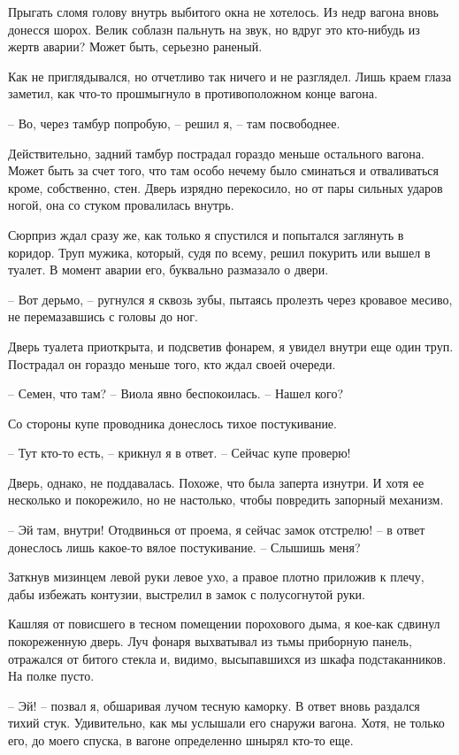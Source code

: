 \documentclass[a4paper]{book}
\begin{document}
Прыгать сломя голову внутрь выбитого окна не хотелось. Из недр вагона вновь донесся шорох. Велик соблазн пальнуть на звук, но вдруг это кто-нибудь из жертв аварии? Может быть, серьезно раненый.

Как не приглядывался, но отчетливо так ничего и не разглядел. Лишь краем глаза заметил, как что-то прошмыгнуло в противоположном конце вагона.

-- Во, через тамбур попробую, -- решил я, -- там посвободнее. 

Действительно, задний тамбур пострадал гораздо меньше остального вагона. Может быть за счет того, что там особо нечему было сминаться и отваливаться кроме, собственно, стен. Дверь изрядно перекосило, но от пары сильных ударов ногой, она со стуком провалилась внутрь.

Сюрприз ждал сразу же, как только я спустился и попытался заглянуть в коридор. Труп мужика, который, судя по всему, решил покурить или вышел в туалет. В момент аварии его, буквально размазало о двери. 

-- Вот дерьмо, -- ругнулся я сквозь зубы, пытаясь пролезть через кровавое месиво, не перемазавшись с головы до ног. 

Дверь туалета приоткрыта, и подсветив фонарем, я увидел внутри еще один труп. Пострадал он гораздо меньше того, кто ждал своей очереди.

-- Семен, что там? -- Виола явно беспокоилась. -- Нашел кого?

Со стороны купе проводника донеслось тихое постукивание. 

-- Тут кто-то есть, -- крикнул я в ответ. -- Сейчас купе проверю!

Дверь, однако, не поддавалась. Похоже, что была заперта изнутри. И хотя ее несколько и покорежило, но не настолько, чтобы повредить запорный механизм. 

-- Эй там, внутри! Отодвинься от проема, я сейчас замок отстрелю! -- в ответ донеслось лишь какое-то вялое постукивание. -- Слышишь меня? 

Заткнув мизинцем левой руки левое ухо, а правое плотно приложив к плечу, дабы избежать контузии, выстрелил в замок с полусогнутой руки. 

Кашляя от повисшего в тесном помещении порохового дыма, я кое-как сдвинул покореженную дверь. Луч фонаря выхватывал из тьмы приборную панель, отражался от битого стекла и, видимо, высыпавшихся из шкафа подстаканников. На полке пусто.

-- Эй! -- позвал я, обшаривая лучом тесную каморку. В ответ вновь раздался тихий стук. Удивительно, как мы услышали его снаружи вагона. Хотя, не только его, до моего спуска, в вагоне определенно шнырял кто-то еще.
\end{document}
